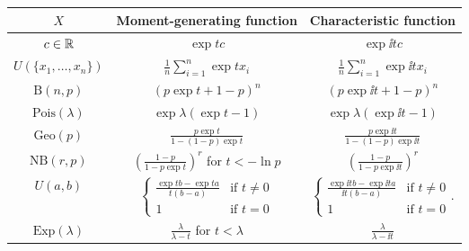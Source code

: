\documentclass[../../../main.tex]{subfiles}
\begin{document}
\begin{center}
  \def\arraystretch{1.5}
  \begin{tabular}{|c|c|c|}
    \hline
    $X$                          & Moment-generating function                                                & Characteristic function                                         \\
    \hline
    $c\in\mathbb{R}$                    & $\displaystyle \exp{tc}$                                                  & $\displaystyle \exp{\ii tc}$                                    \\
    $U(\{x_1,\ldots,x_n\})$      & $\frac{1}{n}\sum_{i=1}^n \exp{tx_i}$                                      & $\frac{1}{n}\sum_{i=1}^n \exp{\ii tx_i}$                        \\
    $\text{B}(n,p)$              & $\displaystyle {(p\exp{t}+1-p)}^n$                                        & $\displaystyle {(p\exp{\ii t}+1-p)}^n$                          \\
    $\text{Pois}(\lambda)$       & $\displaystyle \exp{\lambda(\exp{t}-1)}$                                  & $\displaystyle \exp{\lambda(\exp{\ii t}-1)}$                    \\
    $\text{Geo}(p)$              & $\displaystyle \frac{p\exp{t}}{1-(1-p)\exp{t}}$                           & $\displaystyle \frac{p\exp{\ii t}}{1-(1-p)\exp{\ii t}}$         \\
    $\text{NB}(r,p)$             & $\displaystyle {\left(\frac{1-p}{1-p\exp{t}}\right)}^r$ for $t<-\ln p$    & $\displaystyle {\left(\frac{1-p}{1-p\exp{\ii t}}\right)}^r$     \\
    $U(a,b)$                     & $\displaystyle \begin{cases}
        \frac{\exp{tb}-\exp{ta}}{t(b-a)} & \text{if }t\ne 0 \\
        1                                & \text{if }t=0
      \end{cases}$                               & $\displaystyle \begin{cases}
        \frac{\exp{\ii tb}-\exp{\ii ta}}{\ii t(b-a)} & \text{if }t\ne 0 \\
        1                                            & \text{if }t=0
      \end{cases}.$                    \\
    $\text{Exp}(\lambda)$        & $\displaystyle \frac{\lambda}{\lambda-t}$  for $t<\lambda$                & $\displaystyle \frac{\lambda}{\lambda-\ii t}$                   \\

\end{tabular}
\end{center}
\end{document}
